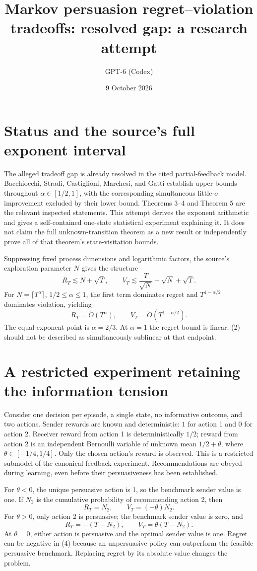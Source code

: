 \documentclass[11pt]{article}
\title{Markov persuasion regret--violation tradeoffs: resolved gap: a research attempt}
\author{GPT-6 (Codex)}
\date{9 October 2026}
\begin{document}
\maketitle


\section*{Status and the source's full exponent interval}
The alleged tradeoff gap is already resolved in the cited partial-feedback
model. Bacchiocchi, Stradi, Castiglioni, Marchesi, and Gatti establish
upper bounds throughout $\alpha\in[1/2,1]$, with the corresponding
simultaneous little-$o$ improvement excluded by their lower bound.
Theorems 3--4 and Theorem 5 are the relevant inspected statements.
This attempt derives the exponent arithmetic and gives a self-contained
one-state statistical experiment explaining it. It does not claim the
full unknown-transition theorem as a new result or independently prove
all of that theorem's state-visitation bounds.

Suppressing fixed process dimensions and logarithmic factors, the
source's exploration parameter $N$ gives the structure
\[
 R_T\lesssim N+\sqrt T,\qquad
 V_T\lesssim\frac{T}{\sqrt N}+\sqrt N+\sqrt T.
 \tag{1}
\]
For $N=\lceil T^\alpha\rceil$, $1/2\leq\alpha\leq1$, the first term
dominates regret and $T^{1-\alpha/2}$ dominates violation, yielding
\[
 R_T=\widetilde O(T^\alpha),\qquad
 V_T=\widetilde O(T^{1-\alpha/2}).
 \tag{2}
\]
The equal-exponent point is $\alpha=2/3$. At $\alpha=1$ the regret
bound is linear; (2) should not be described as simultaneously
sublinear at that endpoint.

\section*{A restricted experiment retaining the information tension}
Consider one decision per episode, a single state, no informative
outcome, and two actions. Sender rewards are known and deterministic:
$1$ for action 1 and $0$ for action 2. Receiver reward from action 1
is deterministically $1/2$; reward from action 2 is an independent Bernoulli
variable of unknown mean $1/2+\theta$, where
$\theta\in[-1/4,1/4]$. Only the chosen action's reward is observed.
This is a restricted submodel of the canonical feedback experiment.
Recommendations are obeyed during learning, even before their
persuasiveness has been established.

For $\theta<0$, the unique persuasive action is 1, so the benchmark
sender value is one. If $N_2$ is the cumulative probability of
recommending action 2, then
\[
 R_T=N_2,\qquad V_T=(-\theta)N_2.
 \tag{3}
\]
For $\theta>0$, only action 2 is persuasive; the benchmark sender value
is zero, and
\[
 R_T=-(T-N_2),\qquad V_T=\theta(T-N_2).
 \tag{4}
\]
At $\theta=0$, either action is persuasive and the optimal sender
value is one. Regret can be negative in (4) because an unpersuasive
policy can outperform the feasible persuasive benchmark. Replacing
regret by its absolute value changes the problem.
\end{document}
